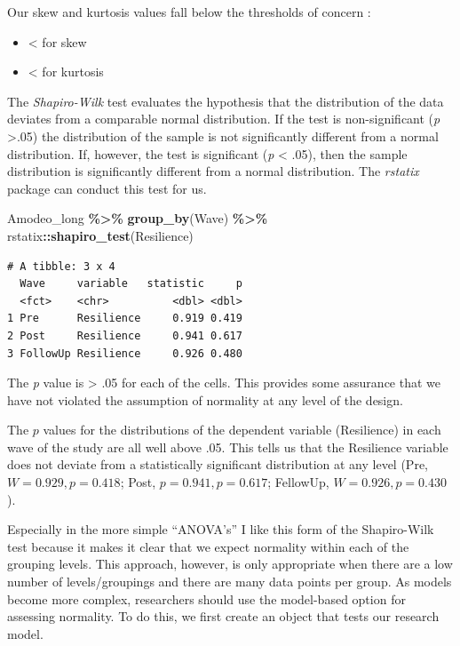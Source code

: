 \documentclass[
  11pt,
]{book}
\newenvironment{Shaded}{\begin{snugshade}}{\end{snugshade}}
\newcommand{\FunctionTok}[1]{\textcolor[rgb]{0.27,0.27,0.27}{\textbf{#1}}}
\newcommand{\NormalTok}[1]{#1}
\newcommand{\SpecialCharTok}[1]{\textcolor[rgb]{0.43,0.43,0.43}{\textbf{#1}}}
\providecommand{\tightlist}{%
  \setlength{\itemsep}{0pt}\setlength{\parskip}{0pt}}
\begin{document}
Our skew and kurtosis values fall below the thresholds of concern \citep{kline_data_2016}:

\begin{itemize}
\tightlist
\item
  \textless{} \textbar{} for skew
\item
  \textless{} \textbar{} for kurtosis
\end{itemize}

The \emph{Shapiro-Wilk} test evaluates the hypothesis that the distribution of the data deviates from a comparable normal distribution. If the test is non-significant (\emph{p} \textgreater.05) the distribution of the sample is not significantly different from a normal distribution. If, however, the test is significant (\emph{p} \textless{} .05), then the sample distribution is significantly different from a normal distribution. The \emph{rstatix} package can conduct this test for us.

\begin{Shaded}
\begin{Highlighting}[]
\NormalTok{Amodeo\_long }\SpecialCharTok{\%\textgreater{}\%}
    \FunctionTok{group\_by}\NormalTok{(Wave) }\SpecialCharTok{\%\textgreater{}\%}
\NormalTok{    rstatix}\SpecialCharTok{::}\FunctionTok{shapiro\_test}\NormalTok{(Resilience)}
\end{Highlighting}
\end{Shaded}

\begin{verbatim}
# A tibble: 3 x 4
  Wave     variable   statistic     p
  <fct>    <chr>          <dbl> <dbl>
1 Pre      Resilience     0.919 0.419
2 Post     Resilience     0.941 0.617
3 FollowUp Resilience     0.926 0.480
\end{verbatim}

The \emph{p} value is \textgreater{} .05 for each of the cells. This provides some assurance that we have not violated the assumption of normality at any level of the design.

The \(p\) values for the distributions of the dependent variable (Resilience) in each wave of the study are all well above .05. This tells us that the Resilience variable does not deviate from a statistically significant distribution at any level (Pre, \(W = 0.929, p = 0.418\); Post, \(p = 0.941, p = 0.617\); FellowUp, \(W = 0.926, p = 0.430\)).

Especially in the more simple ``ANOVA's'' I like this form of the Shapiro-Wilk test because it makes it clear that we expect normality within each of the grouping levels. This approach, however, is only appropriate when there are a low number of levels/groupings and there are many data points per group. As models become more complex, researchers should use the model-based option for assessing normality. To do this, we first create an object that tests our research model.
\end{document}
